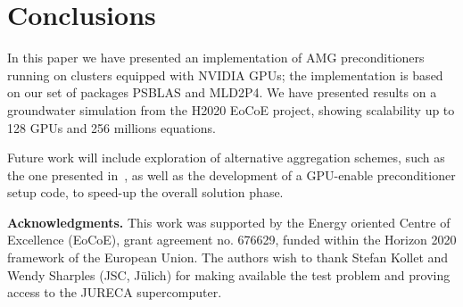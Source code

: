 \section{Conclusions} \label{sec:concl}
In this paper we have presented an implementation of AMG
preconditioners running on clusters equipped with NVIDIA GPUs; the
implementation is based on our set of packages PSBLAS and MLD2P4. 
We have presented results on a groundwater simulation from the H2020
EoCoE project, showing scalability up to 128 GPUs and 256 millions
equations. 

Future work will include exploration of alternative aggregation
schemes, such as the one presented in~\cite{bcm-toms}, as well as the
development of a GPU-enable preconditioner setup code, to speed-up the
overall solution phase.

\bigskip
\noindent \textbf{Acknowledgments.}
This work was supported by the Energy oriented Centre of Excellence (EoCoE),
grant agreement no. 676629, funded within the Horizon 2020 framework of the European Union.
The authors wish to thank Stefan Kollet and Wendy Sharples (JSC, J\"ulich) for making available
the test problem and proving access to the JURECA supercomputer.